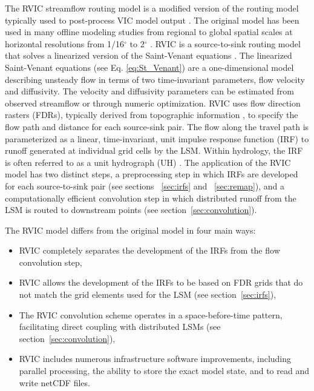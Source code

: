 \documentclass[jgrga, draft]{agutex}
\begin{document}
\begin{article}
The RVIC streamflow routing model is a modified version of the routing model typically used to post-process VIC model output \citep{Lohmann_1996, Lohmann_1998a}.
The original \citet{Lohmann_1996} model has been used in many offline modeling studies from regional to global spatial scales at horizontal resolutions from 1/16$^{\circ}$ to 2$^{\circ}$ \citep[e.g.][]{Nijssen_1997,Lohmann_1998b,Su_2005,Hamlet_2013}.
RVIC is a source-to-sink routing model that solves a linearized version of the Saint-Venant equations \citep{Fread_1992,Mesa_1986}.
The linearized Saint-Venant equations (see Eq. \ref{eq:St_Venant}) are a one-dimensional model describing unsteady flow in terms of two time-invariant parameters, flow velocity and diffusivity.
The velocity and diffusivity parameters can be estimated from observed streamflow or through numeric optimization.
RVIC uses flow direction rasters (FDRs), typically derived from topographic information \citep[e.g.][]{Wu_2011}, to specify the flow path and distance for each source-sink pair.
The flow along the travel path is parameterized as a linear, time-invariant, unit impulse response function (IRF) to runoff generated at individual grid cells by the LSM.
Within hydrology, the IRF is often referred to as a unit hydrograph (UH) \citep[e.g.][]{Sherman_1932,Nash_1957}.
The application of the RVIC model has two distinct steps, a preprocessing step in which IRFs are developed for each source-to-sink pair (see sections ~\ref{sec:irfs} and ~\ref{sec:remap}), and a computationally efficient convolution step in which distributed runoff from the LSM is routed to downstream points (see section~\ref{sec:convolution}).

The RVIC model differs from the original \citet{Lohmann_1996} model in four main ways:

\begin{itemize}[leftmargin=+.5in]
\item RVIC completely separates the development of the IRFs from the flow convolution step,
\item RVIC allows the development of the IRFs to be based on FDR grids that do not match the grid elements used for the LSM (see section~\ref{sec:irfs}),
\item The RVIC convolution scheme operates in a space-before-time pattern, facilitating direct coupling with distributed LSMs (see section~\ref{sec:convolution}),
\item RVIC includes numerous infrastructure software improvements, including parallel processing, the ability to store the exact model state, and to read and write netCDF files.
\end{itemize}


\end{article}
\end{document}
